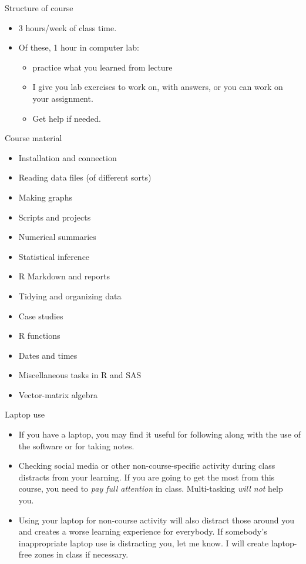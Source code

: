 \documentclass[unknownkeysallowed]{beamer}\usepackage[]{graphicx}\usepackage[]{color}
\begin{document}
\begin{frame}{Structure of course}

  \begin{itemize}
  \item 3 hours/week of class time.
  \item Of these, 1 hour in computer lab:
    \begin{itemize}
    \item practice what you learned from lecture
    \item I give you lab exercises to work on, with answers, or you
      can work on your assignment.
    \item Get help if needed.
    \end{itemize}
  \end{itemize}
  
\end{frame}

\begin{frame}{Course material}
  
\begin{itemize}
\item Installation and connection
\item Reading data files (of different sorts)
\item Making graphs
\item Scripts and projects
\item Numerical summaries
\item Statistical inference
\item R Markdown and reports
\item Tidying and organizing data
\item Case studies
\item R functions
\item Dates and times
\item Miscellaneous tasks in R and SAS
\item Vector-matrix algebra
\end{itemize}

  
\end{frame}

\begin{frame}[fragile]{Laptop use}
  
  \begin{itemize}
  \item If you have a laptop, you may find it useful for following
    along with the use of the software or for taking notes.
  \item Checking social media or other non-course-specific activity
    during class distracts from your learning. If you are going to get the most
    from this course, you need to \emph{pay full attention} in
    class. Multi-tasking \emph{will not} help you.
  \item Using your laptop for non-course activity will also distract
    those around you and creates a worse learning experience for
    everybody. If somebody's inappropriate laptop use is distracting
    you, let me know. I will create laptop-free zones in class if
    necessary. 
  \end{itemize}
  
\end{frame}
\end{document}
